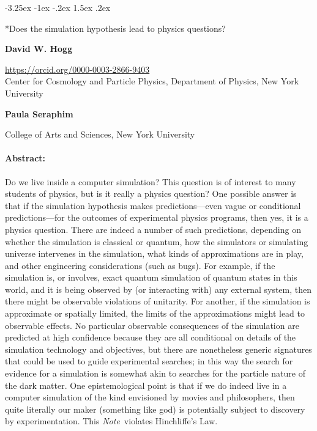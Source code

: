 \documentclass[12pt,letterpaper]{article}
\makeatletter
\renewcommand\section{\@startsection {section}{1}{\z@}%
  {-3.25ex \@plus -1ex \@minus -.2ex}%
  {1.5ex \@plus .2ex}%
  {\raggedright\normalfont\large\bfseries}}
\newcommand{\documentname}{\textsl{Note}}
\makeatother
\begin{document}
\section*{Does the simulation hypothesis lead to physics questions?}

\medskip\noindent
\textbf{David W. Hogg}
{\par\noindent\footnotesize%
\url{https://orcid.org/0000-0003-2866-9403}\\Center for Cosmology and Particle Physics, Department of Physics, New York University%
\par}

\medskip\noindent
\textbf{Paula Seraphim}
{\par\noindent\footnotesize%
College of Arts and Sciences, New York University%
\par}

\paragraph{Abstract:}
Do we live inside a computer simulation?
This question is of interest to many students of physics, but is it really a physics question?
One possible answer is that if the simulation hypothesis makes predictions---even vague or conditional predictions---for the outcomes of experimental physics programs, then yes, it is a physics question.
There are indeed a number of such predictions, depending on whether the simulation is classical or quantum, how the simulators or simulating universe intervenes in the simulation, what kinds of approximations are in play, and other engineering considerations (such as bugs).
For example, if the simulation is, or involves, exact quantum simulation of quantum states in this world, and it is being observed by (or interacting with) any external system, then there might be observable violations of unitarity.
For another, if the simulation is approximate or spatially limited, the limits of the approximations might lead to observable effects.
No particular observable consequences of the simulation are predicted at high confidence because they are all conditional on details of the simulation technology and objectives, but there are nonetheless generic signatures that could be used to guide experimental searches; in this way the search for evidence for a simulation is somewhat akin to searches for the particle nature of the dark matter.
One epistemological point is that if we do indeed live in a computer simulation of the kind envisioned by movies and philosophers, then quite literally our maker (something like god) is potentially subject to discovery by experimentation.
This \documentname\ violates Hinchliffe's Law.
\end{document}
